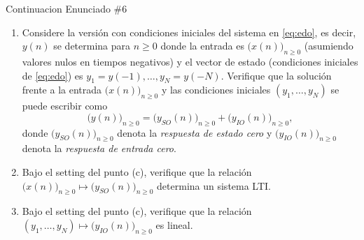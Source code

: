 \documentclass[
    10pt,
    aspectratio=169,
    xcolor={dvipsnames},
    spanish,
    ]{beamer}
\begin{document}
\begin{frame}
  \begin{block}{Continuacion Enunciado \#6}
    \begin{enumerate}
      \item Considere la versión con condiciones iniciales del sistema en \eqref{eq:edo}, es decir, $y(n)$ se determina para $n\ge 0$ donde la entrada es $\big(x(n)\big)_{n\ge 0}$ (asumiendo valores nulos en tiempos negativos) y el vector de estado (condiciones iniciales de \eqref{eq:edo}) es $y_1=y(-1),\ldots,y_N=y(-N)$. Verifique que la solución frente a la entrada $\big(x(n)\big)_{n\ge 0}$ y las condiciones iniciales $(y_1,\ldots,y_N)$ se puede escribir como
  \begin{equation}
    \big(y(n)\big)_{n\ge 0} = \big(y_{SO}(n)\big)_{n\ge 0} + \big(y_{IO}(n)\big)_{n\ge 0},
  \end{equation}
  donde $\big(y_{SO}(n)\big)_{n\ge 0}$ denota la \emph{respuesta de estado cero} y $\big(y_{IO}(n)\big)_{n\ge 0}$ denota la \emph{respuesta de entrada cero}.
  \item Bajo el setting del punto (c), verifique que la relación $\big(x(n)\big)_{n\ge 0} \mapsto \big(y_{SO}(n)\big)_{n\ge 0}$ determina un sistema LTI.
  \item Bajo el setting del punto (c), verifique que la relación $(y_1,\ldots,y_N) \mapsto \big(y_{IO}(n)\big)_{n\ge 0}$ es lineal.
\end{enumerate}
  \end{block}
\end{frame}
\end{document}
